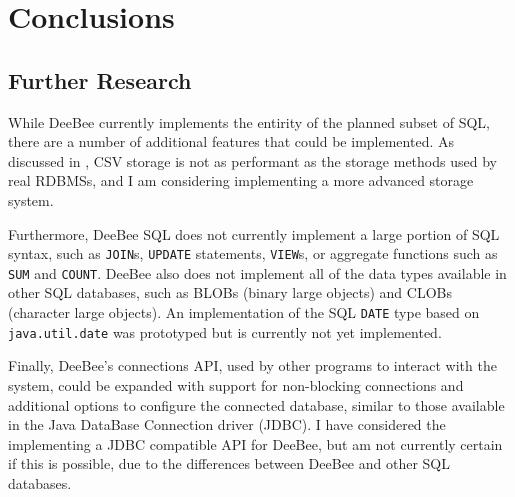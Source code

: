 
\section{Conclusions}
\subsection{Further Research}
While DeeBee currently implements the entirity of the planned subset of SQL, there are a number of additional features that could be implemented. As discussed in , CSV storage is not as performant as the storage methods used by real RDBMSs, and I am considering implementing a more advanced storage system. 

Furthermore, DeeBee SQL does not currently implement a large portion of SQL syntax, such as \texttt{JOIN}s, \texttt{UPDATE} statements, \texttt{VIEW}s, or aggregate functions such as \texttt{SUM} and \texttt{COUNT}. DeeBee also does not implement all of the data types available in other SQL databases, such as BLOBs (binary large objects) and CLOBs (character large objects). An implementation of the SQL \texttt{DATE} type based on \texttt{java.util.date} was prototyped but is currently not yet implemented. 

Finally, DeeBee's connections API, used by other programs to interact with the system, could be expanded with support for non-blocking connections and additional options to configure the connected database, similar to those available in the Java DataBase Connection driver (JDBC). I have considered the implementing a JDBC compatible API for DeeBee, but am not currently certain if this is possible, due to the differences between DeeBee and other SQL databases.
\pagebreak
{}


